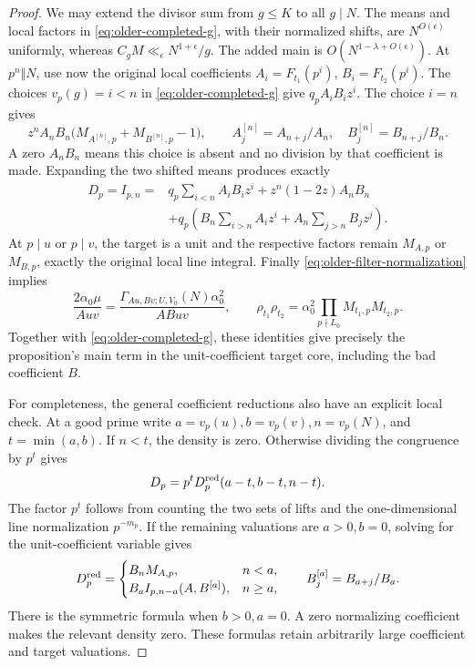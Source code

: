 \begin{proof}
We may extend the divisor sum from \(g\le K\) to all \(g\mid N\).
The means and local factors in \eqref{eq:older-completed-g},
with their normalized shifts, are \(N^{O(\epsilon)}\) uniformly,
whereas \(C_gM\ll_\epsilon N^{1+\epsilon}/g\).
The added main is \(O(N^{1-\lambda+O(\epsilon)})\).
At \(p^n\Vert N\), use now the original local coefficients
\(A_i=F_{t_1}(p^i)\), \(B_i=F_{t_2}(p^i)\).
The choices \(v_p(g)=i<n\) in \eqref{eq:older-completed-g}
give \(q_p A_iB_i z^i\).
The choice \(i=n\) gives
\[
 z^nA_nB_n
    \big(M_{A^{[n]},p}+M_{B^{[n]},p}-1\big),\qquad
          A^{[n]}_j=A_{n+j}/A_n,\quad B^{[n]}_j=B_{n+j}/B_n.
\]
A zero \(A_nB_n\) means this choice is absent and no division
by that coefficient is made.
Expanding the two shifted means produces exactly
\[
 \begin{split}
 D_p=I_{p,n}={}&q_p\sum_{i<n}A_iB_i z^i
       +z^n(1-2z)A_nB_n\\
 &+q_p\left(B_n\sum_{i>n}A_i z^i
                         +A_n\sum_{j>n}B_j z^j\right).
 \end{split}
\]
At \(p\mid u\) or \(p\mid v\), the target is a unit and the
respective factors remain \(M_{A,p}\) or \(M_{B,p}\), exactly
the original local line integral.
Finally \eqref{eq:older-filter-normalization} implies
\[
 \frac{2\alpha_0\mu}{Auv}
       =\frac{\Gamma_{Au,Bv;U,V_0}(N)\alpha_0^2}{ABuv},
 \qquad
 \rho_{t_1}\rho_{t_2}=\alpha_0^2
                      \prod_{p\nmid L_0}M_{t_1,p}M_{t_2,p}.
\]
Together with \eqref{eq:older-completed-g}, these identities
give precisely the proposition's main term in the unit-coefficient
target core, including the bad coefficient \(B\).

For completeness, the general coefficient reductions also have an
explicit local check.  At a good prime write
\(a=v_p(u),b=v_p(v),n=v_p(N)\), and \(t=\min(a,b)\).
If \(n<t\), the density is zero.
Otherwise dividing the congruence by \(p^t\) gives
\[
 D_p=p^tD_p^{\rm red}(a-t,b-t,n-t).
\]
The factor \(p^t\) follows from counting the two sets of lifts
and the one-dimensional line normalization \(p^{-m_p}\).
If the remaining valuations are \(a>0,b=0\), solving for the
unit-coefficient variable gives
\[
 D_p^{\rm red}=
 \begin{cases}
    B_nM_{A,p},&n<a,\\
    B_a I_{p,n-a}(A,B^{[a]}),&n\ge a,
 \end{cases}
 \qquad B^{[a]}_j=B_{a+j}/B_a .
\]
There is the symmetric formula when \(b>0,a=0\).
A zero normalizing coefficient makes the relevant density zero.
These formulas retain arbitrarily large coefficient and target
valuations.


\end{proof}
